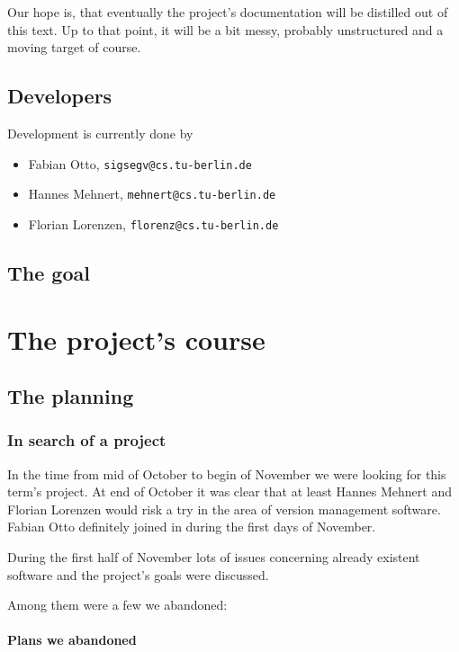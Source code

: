 \documentclass[fleqn, 10pt, a4paper]{report}
\begin{document}
Our hope is, that eventually the project's documentation will be
distilled out of this text. Up to that point, it will be a bit messy,
probably unstructured and a moving target of course.


\section{Developers}

Development is currently done by
\begin{itemize}
\item Fabian Otto, \texttt{sigsegv@cs.tu-berlin.de}
\item Hannes Mehnert, \texttt{mehnert@cs.tu-berlin.de}
\item Florian Lorenzen, \texttt{florenz@cs.tu-berlin.de}
\end{itemize}


\section{The goal}




\chapter{The project's course}

\section{The planning}

\subsection{In search of a project}

In the time from mid of October to begin of November we were looking
for this term's project. At end of October it was clear that at least
Hannes Mehnert and Florian Lorenzen would risk a try in the area of
version management software. Fabian Otto definitely joined in during the
first days of November.

During the first half of November lots of issues concerning
already existent software and the project's goals were discussed.

Among them were a few we abandoned:

\subsubsection{Plans we abandoned}
\end{document}
